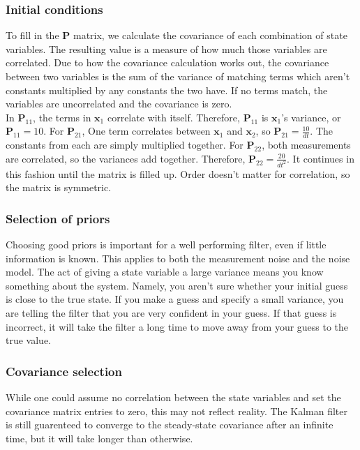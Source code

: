 \documentclass[10pt,conference,compsoc]{IEEEtran}
\newcommand{\mtx}[1] {\bm #1}
\begin{document}
\subsubsection{Initial conditions}

\noindent To fill in the $\mtx{P}$ matrix, we calculate the covariance of each
combination of state variables. The resulting value is a measure of how much
those variables are correlated. Due to how the covariance calculation works out,
the covariance between two variables is the sum of the variance of matching
terms which aren't constants multiplied by any constants the two have. If no
terms match, the variables are uncorrelated and the covariance is zero. \\

\noindent In $\mtx{P}_{11}$, the terms in $\mtx{x}_1$ correlate with itself.
Therefore, $\mtx{P}_{11}$ is $\mtx{x}_1$'s variance, or $\mtx{P}_{11} = 10$.
For $\mtx{P}_{21}$, One term correlates between $\mtx{x}_1$ and $\mtx{x}_2$, so
$\mtx{P}_{21} = \frac{10}{dt}$. The constants from each are simply multiplied
together. For $\mtx{P}_{22}$, both measurements are correlated, so the variances
add together. Therefore, $\mtx{P}_{22} = \frac{20}{dt^2}$. It continues in this
fashion until the matrix is filled up. Order doesn't matter for correlation, so
the matrix is symmetric. \\

\subsubsection{Selection of priors}

\noindent Choosing good priors is important for a well performing filter, even
if little information is known. This applies to both the measurement noise and
the noise model. The act of giving a state variable a large variance means you
know something about the system. Namely, you aren't sure whether your initial
guess is close to the true state. If you make a guess and specify a small
variance, you are telling the filter that you are very confident in your guess.
If that guess is incorrect, it will take the filter a long time to move away
from your guess to the true value.

\subsubsection{Covariance selection}

While one could assume no correlation between the state variables and set the
covariance matrix entries to zero, this may not reflect reality. The Kalman
filter is still guarenteed to converge to the steady-state covariance after an
infinite time, but it will take longer than otherwise.
\end{document}
